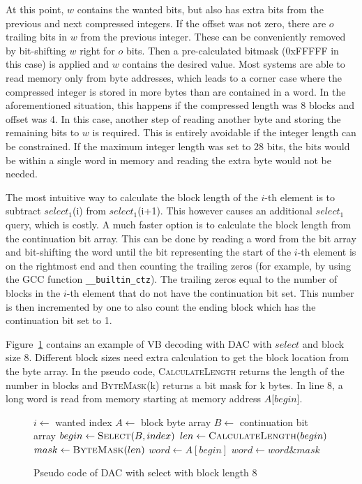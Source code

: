 At this point, $w$ contains the wanted bits, but also has extra bits from the previous and next compressed integers. If the offset was not zero, there are $o$ trailing bits in $w$ from the previous integer. 
These can be conveniently removed by bit-shifting $w$ right for $o$ bits. Then a pre-calculated bitmask (0xFFFFF in this case) is applied and $w$ contains the desired value. Most systems are
able to read memory only from byte addresses, which leads to a corner case where the compressed integer is stored in more bytes than are contained in a word. In the aforementioned situation, this 
happens if the compressed length was 8 blocks and offset was 4. In this case, another step of reading another byte and storing the remaining bits to $w$ is required. This is entirely avoidable if the integer 
length can be constrained. If the maximum integer length was set to 28 bits, the bits would be within a single word in memory and reading the extra byte would not be needed.

The most intuitive way to calculate the block length of the $i$-th element is to subtract $select_1$(i) from $select_1$(i+1). This however causes an additional 
$select_1$ query, which is costly. A much faster option is to calculate the block length from the continuation bit array. This can be done by reading a word from the bit array and bit-shifting the word 
until the bit representing the start of the $i$-th element is on the rightmost end and then counting the trailing zeros (for example, by using the GCC function \texttt{\_\_builtin\_ctz}). The trailing zeros equal to the number of blocks in the $i$-th element that do not have the continuation bit set. 
This number is then incremented by one to also count the ending block which has the continuation bit set to 1.
 
Figure~\ref{select_pseudo} contains an example of VB decoding with DAC with $select$ and block size 8. 
Different block sizes need extra calculation to get the block location from the byte array. In the pseudo code, \textsc{CalculateLength} returns the length of the number in blocks and \textsc{ByteMask}(k) returns 
a bit mask for k bytes. In line 8, a long word is read from memory starting at memory address $A$[$begin$].

\begin{figure}[ht]
\centering
\begin{minipage}{0.5\linewidth}
\begin{algorithmic}[1]
\State $i \gets $ wanted index
\State $A \gets $ block byte array
\State $B \gets $ continuation bit array
\State $begin \gets \Call{Select}{B, index}$
\State $len \gets \Call{CalculateLength}{begin}$
\State $mask \gets \Call{ByteMask}{len}$
\State $word \gets A[begin]$
\State $word \gets word \mathbin{\&} mask$ 

\end{algorithmic}
\end{minipage}
\caption{Pseudo code of DAC with select with block length 8} \label{select_pseudo}
\end{figure}

